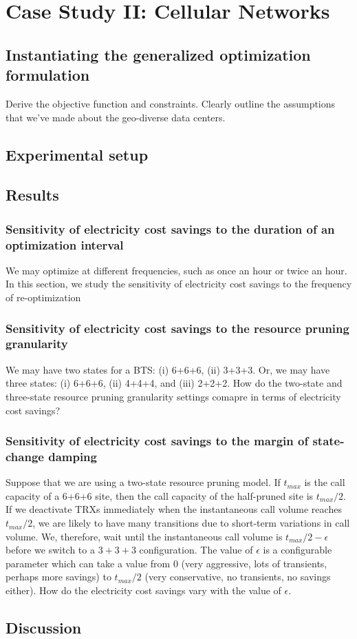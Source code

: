 \chapter{Case Study II: Cellular Networks}
\label{chap:casestudy2}
\section{Instantiating the generalized optimization formulation} Derive the objective function and constraints. Clearly outline the assumptions that we've made about the geo-diverse data centers.

\section{Experimental setup} 

\section{Results}
\subsection{Sensitivity of electricity cost savings to the duration of an optimization interval} We may optimize at different frequencies, such as once an hour or twice an hour. In this section, we study the sensitivity of electricity cost savings to the frequency of re-optimization
\subsection{Sensitivity of electricity cost savings to the resource pruning granularity} We may have two states for a BTS: (i) 6+6+6, (ii) 3+3+3. Or, we may have three states: (i) 6+6+6, (ii) 4+4+4, and (iii) 2+2+2. How do the two-state and three-state resource pruning granularity settings comapre in terms of electricity cost savings? 
\subsection{Sensitivity of electricity cost savings to the margin of state-change damping} Suppose that we are using a two-state resource pruning model. If $t_{max}$ is the call capacity of a 6+6+6 site, then the call capacity of the half-pruned site is $t_{max}/2$. If we deactivate TRXs immediately when the instantaneous call volume reaches $t_{max}/2$, we are likely to have many transitions due to short-term variations in call volume. We, therefore, wait until the instantaneous call volume is $t_{max}/2 - \epsilon$ before we switch to a $3+3+3$ configuration. The value of $\epsilon$ is a configurable parameter which can take a value from $0$ (very aggressive, lots of transients, perhaps more savings) to $t_{max}/2$ (very conservative, no transients, no savings either). How do the electricity cost savings vary with the value of $\epsilon$.

\section{Discussion}